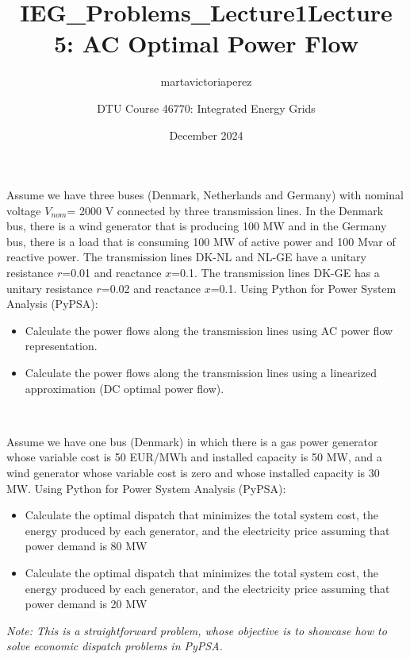 \documentclass[10pt]{article}
\title{IEG_Problems_Lecture1}
\author{martavictoriaperez }
\date{December 2024}
\newenvironment{problem}[2][Problem]{\begin{trivlist}
\item[\hskip \labelsep {\bfseries #1}\hskip \labelsep {\bfseries #2.}]}{\end{trivlist}}
\begin{document}
 
\title{\textbf{Lecture 5: AC Optimal Power Flow}}
\author{
DTU Course 46770: Integrated Energy Grids }
\maketitle
\begin{problem}{5.1}
Assume we have three buses (Denmark, Netherlands and Germany) with nominal voltage $V_{nom}$= 2000 V connected by three transmission lines. In the Denmark bus, there is a wind generator that is producing 100 MW and in the Germany bus, there is a load that is consuming 100 MW of active power and 100 Mvar of reactive power. The transmission lines DK-NL and NL-GE have a unitary resistance $r$=0.01 and reactance $x$=0.1. The transmission lines DK-GE has a unitary resistance $r$=0.02 and reactance $x$=0.1. Using Python for Power System Analysis (PyPSA):

\begin{itemize}
\item[a)] Calculate the power flows along the transmission lines using AC power flow representation.

\item[b)]  Calculate the power flows along the transmission lines using a linearized approximation (DC optimal power flow).
\end{itemize}

\end{problem}

\

\begin{problem}{5.2}

Assume we have one bus (Denmark) in which there is a gas power generator whose variable cost is 50 EUR/MWh and installed capacity is 50 MW, and a wind generator whose variable cost is zero and whose installed capacity is 30 MW. Using Python for Power System Analysis (PyPSA):

\begin{itemize}
\item[a)] Calculate the optimal dispatch that minimizes the total system cost, the energy produced by each generator, and the electricity price assuming that power demand is 80 MW

\item[b)]  Calculate the optimal dispatch that minimizes the total system cost, the energy produced by each generator, and the electricity price assuming that power demand is 20 MW
\end{itemize}

\textit{Note: This is a straightforward problem, whose objective is to showcase how to solve economic dispatch problems in PyPSA.}

\end{problem}
\end{document}
